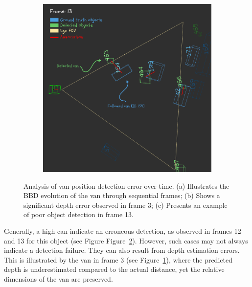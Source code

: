 \begin{figure}[!ht]
\begin{subfigure}[b]{0.32\textwidth}
        \caption{}
        \label{fig:van_bbd_through_frames_b}
    \end{subfigure}
    \hfill
    \begin{subfigure}[b]{0.32\textwidth}
        \includegraphics[width=\textwidth]{images/experiments/evaluation_frames/3d_evaluation_frame_13_canva.png}
        \caption{}
        \label{fig:van_bbd_through_frames_c}
    \end{subfigure}
    \caption{Analysis of van position detection error over time. (a) Illustrates the BBD evolution of the van through sequential frames; (b) Shows a significant depth error observed in frame 3; (c) Presents an example of poor object detection in frame 13.}
    \label{fig:van_bbd_through_frames}
\end{figure}


Generally, a high  can indicate an erroneous detection, as observed in frames 12 and 13 for this object (see Figure Figure~\ref{fig:van_bbd_through_frames_c}). However, such cases may not always indicate a detection failure. They can also result from depth estimation errors. This is illustrated by the van in frame 3 (see Figure~\ref{fig:van_bbd_through_frames_b}), where the predicted depth is underestimated compared to the actual distance, yet the relative dimensions of the van are preserved.

